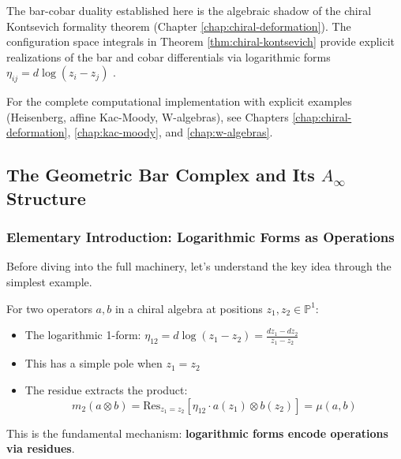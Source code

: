 \begin{remark}
The bar-cobar duality established here is the algebraic shadow of the chiral Kontsevich formality theorem (Chapter \ref{chap:chiral-deformation}). The configuration space integrals in Theorem \ref{thm:chiral-kontsevich} provide explicit realizations of the bar and cobar differentials via logarithmic forms $\eta_{ij} = d\log(z_i - z_j)$ \cite{Kon94, BD04}.

For the complete computational implementation with explicit examples (Heisenberg, affine Kac-Moody, W-algebras), see Chapters \ref{chap:chiral-deformation}, \ref{chap:kac-moody}, and \ref{chap:w-algebras}.
\end{remark}


\subsection{The Geometric Bar Complex and Its $A_\infty$ Structure}

\subsubsection{Elementary Introduction: Logarithmic Forms as Operations}

Before diving into the full machinery, let's understand the key idea through the simplest example.

\begin{example}
For two operators $a, b$ in a chiral algebra at positions $z_1, z_2 \in \mathbb{P}^1$:
\begin{itemize}
\item The logarithmic 1-form: $\eta_{12} = d\log(z_1 - z_2) = \frac{dz_1 - dz_2}{z_1 - z_2}$
\item This has a simple pole when $z_1 = z_2$
\item The residue extracts the product:
$$m_2(a \otimes b) = \text{Res}_{z_1=z_2}\left[\eta_{12} \cdot a(z_1) \otimes b(z_2)\right] = \mu(a,b)$$
\end{itemize}
This is the fundamental mechanism: \textbf{logarithmic forms encode operations via residues}.
\end{example}

